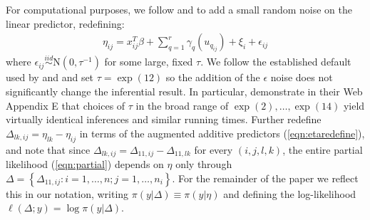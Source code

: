 \documentclass[]{article}
\begin{document}
For computational purposes, we follow \citet{inla} and \citet{casecross} to add a small random noise on the linear predictor, redefining: 
\begin{equation}\begin{aligned}\label{eqn:etaredefine}
\eta_{ij} =x_{ij}^{T}\beta+\sum_{q=1}^{r} \gamma_q(u_{q_{ij}}) +\xi_{i} + \epsilon_{ij}
\end{aligned}\end{equation}
where $\epsilon_{ij} \stackrel{iid}{\sim} \text{N}(0,\tau^{-1})$ for some large, fixed $\tau$. We follow the established default used by \citet{inla} and \citet{casecross} and set $\tau = \exp(12)$ so the addition of the $\epsilon$ noise does not significantly change the inferential result. In particular, \citet{casecross} demonstrate in their Web Appendix E that choices of $\tau$ in the broad range of $\exp(2),\ldots,\exp(14)$ yield virtually identical inferences and similar running times. Further redefine $\Delta_{lk,ij} = \eta_{lk} - \eta_{ij}$ in terms of the augmented additive predictors (\ref{eqn:etaredefine}), and note that since $\Delta_{lk,ij} = \Delta_{11,ij} - \Delta_{11,lk}$ for every $(i,j,l,k)$, the entire partial likelihood (\ref{eqn:partial}) depends on $\eta$ only through  $\Delta = \left\{\Delta_{11,ij}: i = 1,\ldots,n; j = 1,\ldots,n_{i} \right\}$. For the remainder of the paper we reflect this in our notation, writing $\pi(y|\Delta) \equiv \pi(y|\eta)$ and defining the log-likelihood $\ell(\Delta; y) = \log\pi(y|\Delta)$.
\end{document}

